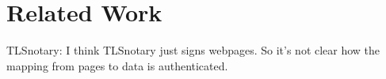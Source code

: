 \section{Related Work}
TLSnotary: I think TLSnotary just signs webpages. So it's not clear how the mapping from pages to data is authenticated.